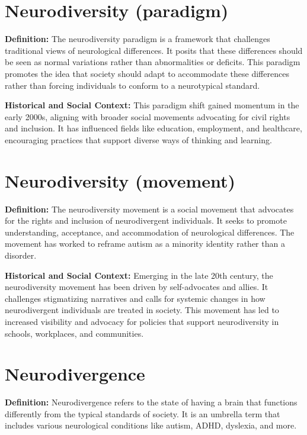 \documentclass[
  letterpaper,
  DIV=11,
  numbers=noendperiod]{scrreprt}
\begin{document}
\section{Neurodiversity (paradigm)}\label{neurodiversity-paradigm}

\textbf{Definition:} The neurodiversity paradigm is a framework that
challenges traditional views of neurological differences. It posits that
these differences should be seen as normal variations rather than
abnormalities or deficits. This paradigm promotes the idea that society
should adapt to accommodate these differences rather than forcing
individuals to conform to a neurotypical standard.

\textbf{Historical and Social Context:} This paradigm shift gained
momentum in the early 2000s, aligning with broader social movements
advocating for civil rights and inclusion. It has influenced fields like
education, employment, and healthcare, encouraging practices that
support diverse ways of thinking and learning.

\section{Neurodiversity (movement)}\label{neurodiversity-movement}

\textbf{Definition:} The neurodiversity movement is a social movement
that advocates for the rights and inclusion of neurodivergent
individuals. It seeks to promote understanding, acceptance, and
accommodation of neurological differences. The movement has worked to
reframe autism as a minority identity rather than a disorder.

\textbf{Historical and Social Context:} Emerging in the late 20th
century, the neurodiversity movement has been driven by self-advocates
and allies. It challenges stigmatizing narratives and calls for systemic
changes in how neurodivergent individuals are treated in society. This
movement has led to increased visibility and advocacy for policies that
support neurodiversity in schools, workplaces, and communities.

\section{Neurodivergence}\label{neurodivergence}

\textbf{Definition:} Neurodivergence refers to the state of having a
brain that functions differently from the typical standards of society.
It is an umbrella term that includes various neurological conditions
like autism, ADHD, dyslexia, and more.
\end{document}
